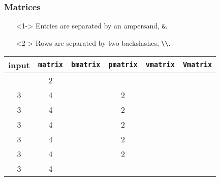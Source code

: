 \begin{frame}[fragile]
\frametitle{Matrices}
\begin{itemize}
	\item[]<1-> Entries are separated by an ampersand, \verb|&|.
	\item[]<2-> Rows are separated by two backslashes, \verb|\\|.
\end{itemize} 
	\vspace{24pt}
	\pause
	\pause
	\hspace{-12pt} \begin{tabular}{c | c | c | c | c | c}
		input & \verb|matrix| & \verb|bmatrix| & \verb|pmatrix| & \verb|vmatrix| & \verb|Vmatrix| \\
		\hline
		\begin{lstlisting}
			\[
			\begin{...} 
				1&2 \\
				3&4
			\end{...}
			\]
		\end{lstlisting}
		&
		\( \begin{smallmatrix} 1&2 \\
				3&4
			\end{smallmatrix}\)
		&
			\( [\begin{smallmatrix} 1&2 \\
				3&4
			\end{smallmatrix}]\)
		&
			\( (\begin{smallmatrix} 1&2 \\
				3&4
			\end{smallmatrix})\)		
		&
				\( |\begin{smallmatrix} 1&2 \\
				3&4
			\end{smallmatrix}|\)		
		&
				\( ||\begin{smallmatrix} 1&2 \\
				3&4
			\end{smallmatrix}||\)
	\end{tabular}	
\end{frame}

